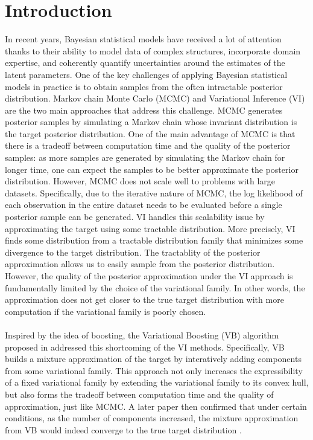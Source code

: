 

\section{Introduction}
In recent years, Bayesian statistical models have received a lot of attention thanks to their ability to model data of complex structures, incorporate domain expertise, and coherently quantify uncertainties around the estimates of the latent parameters. One of the key challenges of applying Bayesian statistical models in practice is to obtain samples from the often intractable posterior distribution. Markov chain Monte Carlo (MCMC) and Variational Inference (VI) are the two main approaches that address this challenge. MCMC generates posterior samples by simulating a Markov chain whose invariant distribution is the target posterior distribution. One of the main advantage of MCMC is that there is a tradeoff between computation time and the quality of the posterior samples: as more samples are generated by simulating the Markov chain for longer time, one can expect the samples to be better approximate the posterior distribution. However, MCMC does not scale well to problems with large datasets. Specifically, due to the iterative nature of MCMC, the log likelihood of each observation in the entire dataset needs to be evaluated before a single posterior sample can be generated. VI handles this scalability issue by approximating the target using some tractable distribution. More precisely, VI finds some distribution from a tractable distribution family that minimizes some divergence to the target distribution. The tractablity of the posterior approximation allows us to easily sample from the posterior distribution. However, the quality of the posterior approximation under the VI approach is fundamentally limited by the choice of the variational family. In other words, the approximation does not get closer to the true target distribution with more computation if the variational family is poorly chosen.\\\\
Inspired by the idea of boosting, the Variational Boosting (VB) algorithm proposed in \cite{miller2017variational} addressed this shortcoming of the VI methods. Specifically, VB builds a mixture approximation of the target by interatively adding components from some variational family. This approach not only increases the expressibility of a fixed variational family by extending the variational family to its convex hull, but also forms the tradeoff between computation time and the quality of approximation, just like MCMC. A later paper then confirmed that under certain conditions, as the number of components increased, the mixture approximation from VB would indeed converge to the true target distribution \cite{locatello2018boosting}.\\\\
